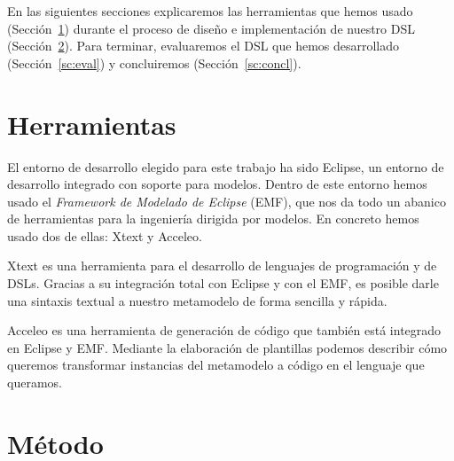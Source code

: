 \documentclass[runningheads]{llncs}
\begin{document}
En las siguientes secciones explicaremos las herramientas que hemos
usado (Sección~\ref{sc:herramientas}) durante el proceso de diseño
e implementación de nuestro DSL (Sección~\ref{sc:metodo}).
%
%
Para terminar, evaluaremos el
DSL que hemos desarrollado (Sección~\ref{sc:eval}) y concluiremos
(Sección~\ref{sc:concl}).

\section{Herramientas}
\label{sc:herramientas}



El entorno de desarrollo elegido para este trabajo ha sido Eclipse, un
entorno de desarrollo integrado con soporte para modelos. Dentro de este
entorno hemos usado el \emph{Framework de Modelado de Eclipse} (EMF),
que nos da todo un abanico de herramientas para la ingeniería dirigida
por modelos. En concreto hemos usado dos de ellas: Xtext y Acceleo.

Xtext es una herramienta para el desarrollo de lenguajes de programación
y de DSLs. Gracias a su integración total con Eclipse y con el EMF,
es posible darle una sintaxis textual a nuestro metamodelo de forma
sencilla y rápida.

Acceleo es una herramienta de generación de código que también está
integrado en Eclipse y EMF. Mediante la elaboración de plantillas
podemos describir cómo queremos transformar instancias del metamodelo
a código en el lenguaje que queramos.

\section{Método}
\label{sc:metodo}

%
\end{document}
